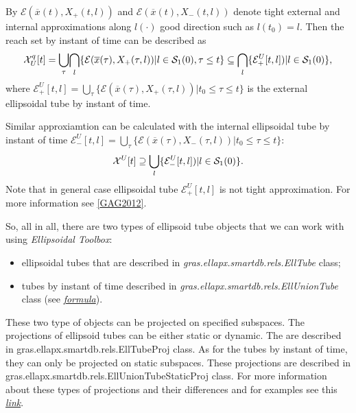 \documentclass[letterpaper,10pt,english]{sphinxmanual}
\begin{document}
By \({\mathcal E}(\overline{x}(t),X_{+}(t,l))\) and \({\mathcal E}(\overline{x}(t),X_{-}(t,l))\) denote tight external and internal approximations along \(l(\cdot)\) good direction such as \(l(t_0)=l\). Then the reach set by instant of time can be described as
\begin{gather}
\begin{split}{\mathcal X}^{q}_{U}[t]=\underset{\tau}{\bigcup}\underset{l}{\bigcap}\{
{\mathcal E}(\overline{x}(\tau),X_{+}(\tau,l)) |l\in {\mathcal S}_1(0),   \tau\leq t\}\subseteq\underset{l} {\bigcap}\{{\mathcal E}^{U}_{+}[t,l])    |l\in {\mathcal S}_1(0)\},\end{split}\notag
\end{gather}
where \({\mathcal E}^{U}_{+}[t,l]=\underset{\tau}{\bigcup}\{{\mathcal E}(\overline{x}(\tau),X_{+}(\tau,l))|t_0\leq\tau\leq t\}\) is the external ellipsoidal tube by instant of time.

Similar approxiamtion can be calculated with the internal ellipsoidal tube by instant of time \({\mathcal E}^{U}_{-}[t,l]=\underset{\tau}{\bigcup}\{{\mathcal E}(\overline{x}(\tau),X_{-}(\tau,l))|t_0\leq\tau\leq t\}\):
\begin{gather}
\begin{split}{\mathcal X}^{U}[t]\supseteq\underset{l}{\bigcup}\{{\mathcal E}^{U}_{-}[t,l]) |l\in {\mathcal S}_1(0)\}.\end{split}\notag
\end{gather}
Note that in general case ellipsoidal tube \({\mathcal E}^{U}_{+}[t,l]\) is not tight approximation. For more information see {\hyperref[chap_ellTube:gag2012]{{[}GAG2012{]}}}.

So, all in all, there are two types of ellipsoid tube objects that we can work with using \emph{Ellipsoidal Toolbox}:
\begin{itemize}
\item {} 
ellipsoidal tubes that are described in \emph{gras.ellapx.smartdb.rels.EllTube} class;

\item {} 
tubes by instant of time described in \emph{gras.ellapx.smartdb.rels.EllUnionTube} class
(see {\hyperref[chap_implement:union-label]{\emph{formula}}}).

\end{itemize}

These two type of objects can be projected on specified subspaces. The projections of ellipsoid tubes can be either static or dynamic. The are described in gras.ellapx.smartdb.rels.EllTubeProj class. As for the tubes by  instant of time, they can only be projected on static subspaces. These projections are described in gras.ellapx.smartdb.rels.EllUnionTubeStaticProj class. For more information about these types of projections and their differences and for examples see this {\hyperref[chap_implement:section-label]{\emph{link}}}.
\end{document}
